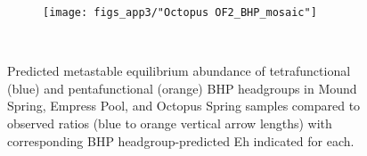 \newpage

\begin{figure}[h]\ContinuedFloat
    \begin{subfigure}[b]{\linewidth}
        \texttt{[image: figs\_app3/"Octopus OF2\_BHP\_mosaic"]}
        \label{fig:OS2_degform}
    \end{subfigure}\\[-4ex]

\caption[Predicted metastable equilibrium abundance of tetrafunctional and pentafunctional BHP headgroups in Mound Spring, Empress Pool, and Octopus Spring samples]{Predicted metastable equilibrium abundance of tetrafunctional (blue) and pentafunctional (orange) BHP headgroups in Mound Spring, Empress Pool, and Octopus Spring samples compared to observed ratios (blue to orange vertical arrow lengths) with corresponding BHP headgroup-predicted Eh indicated for each.}
\label{fig:degree_formation}
\end{figure}
